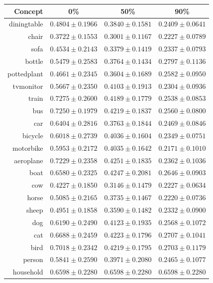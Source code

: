 \documentclass[11pt,a4paper]{article}
\begin{document}
\begin{table}[htbp]
\centering
\begin{tabular}{r|c|c|c}
Concept & 0\% & 50\% & 90\%\\\hline
diningtable   & $0.4804\pm0.1966$ & $0.3840\pm0.1581$ & $0.2409\pm0.0641$\\
chair         & $0.3722\pm0.1553$ & $0.3001\pm0.1167$ & $0.2227\pm0.0789$\\
sofa          & $0.4534\pm0.2143$ & $0.3379\pm0.1419$ & $0.2337\pm0.0793$\\
bottle        & $0.5479\pm0.2583$ & $0.3764\pm0.1434$ & $0.2797\pm0.1136$\\
pottedplant   & $0.4661\pm0.2345$ & $0.3604\pm0.1689$ & $0.2582\pm0.0950$\\
tvmonitor     & $0.5667\pm0.2350$ & $0.4103\pm0.1913$ & $0.2304\pm0.0936$\\
train         & $0.7275\pm0.2600$ & $0.4189\pm0.1779$ & $0.2538\pm0.0853$\\
bus           & $0.7250\pm0.1979$ & $0.4219\pm0.1837$ & $0.2560\pm0.0800$\\
car           & $0.6404\pm0.2816$ & $0.3763\pm0.1844$ & $0.2469\pm0.0846$\\
bicycle       & $0.6018\pm0.2739$ & $0.4036\pm0.1604$ & $0.2349\pm0.0751$\\
motorbike     & $0.5953\pm0.2172$ & $0.4035\pm0.1642$ & $0.2171\pm0.1010$\\
aeroplane     & $0.7229\pm0.2358$ & $0.4251\pm0.1835$ & $0.2362\pm0.1036$\\
boat          & $0.6580\pm0.2325$ & $0.4247\pm0.2081$ & $0.2646\pm0.0903$\\
cow           & $0.4227\pm0.1850$ & $0.3146\pm0.1479$ & $0.2227\pm0.0634$\\
horse         & $0.5085\pm0.2165$ & $0.3735\pm0.1467$ & $0.2220\pm0.0736$\\
sheep         & $0.4951\pm0.1858$ & $0.3590\pm0.1482$ & $0.2332\pm0.0900$\\
dog           & $0.6190\pm0.2490$ & $0.4123\pm0.1935$ & $0.2568\pm0.1072$\\
cat           & $0.6688\pm0.2459$ & $0.4223\pm0.1796$ & $0.2707\pm0.1041$\\
bird          & $0.7018\pm0.2342$ & $0.4219\pm0.1795$ & $0.2703\pm0.1179$\\
person        & $0.5841\pm0.2590$ & $0.3971\pm0.2080$ & $0.2465\pm0.1077$\\\hline
household     & $0.6598\pm0.2280$ & $0.6598\pm0.2280$ & $0.6598\pm0.2280$\\

\end{tabular}
\end{table}
\end{document}
